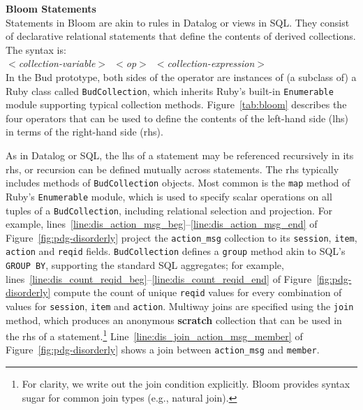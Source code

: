 \vspace{9pt}\noindent \textbf{Bloom Statements}\\
Statements in Bloom are akin to rules in Datalog or views in SQL.  They consist
of declarative relational statements that define the contents of derived
collections.  The syntax is:\\ \noindent
\mbox{\hspace{0.25in}\emph{$<$collection-variable$>$ $<$op$>$
$<$collection-expression$>$}}\\ \noindent In the Bud prototype, both sides of
the operator are instances of (a subclass of) a Ruby class called
\texttt{BudCollection}, which inherits Ruby's built-in \texttt{Enumerable}
module supporting typical collection methods.  Figure~\ref{tab:bloom} describes
the four operators that can be used to define the contents of the left-hand
side (lhs) in terms of the right-hand side (rhs).

As in Datalog or SQL, the lhs of a statement may be referenced recursively in
its rhs, or recursion can be defined mutually across statements.  The rhs
typically includes methods of \texttt{BudCollection} objects.  Most common is
the \texttt{map} method of Ruby's \texttt{Enumerable} module, which is used to
specify scalar operations on all tuples of a \texttt{BudCollection}, including
relational selection and projection. For example,
lines~\ref{line:dis_action_msg_beg}--\ref{line:dis_action_msg_end} of Figure~\ref{fig:pdg-disorderly} project the
\texttt{action\_msg} collection to its \texttt{session}, \texttt{item},
\texttt{action} and \texttt{reqid} fields.  \texttt{BudCollection} defines a
\texttt{group} method akin to SQL's \texttt{GROUP BY}, supporting the standard
SQL aggregates; for example, lines~\ref{line:dis_count_reqid_beg}--\ref{line:dis_count_reqid_end} of
Figure~\ref{fig:pdg-disorderly} compute the count 
of unique \texttt{reqid} values for every combination of values for
\texttt{session}, \texttt{item} and \texttt{action}.
Multiway joins are specified using the \texttt{join} method, which produces an anonymous \textbf{scratch} collection that can
be used in the rhs of a statement.\footnote{For clarity, we write out the join condition explicitly. Bloom provides syntax sugar for common join types (e.g., natural join).}
Line~\ref{line:dis_join_action_msg_member} of Figure~\ref{fig:pdg-disorderly}
shows a join between \texttt{action\_msg} and \texttt{member}.



